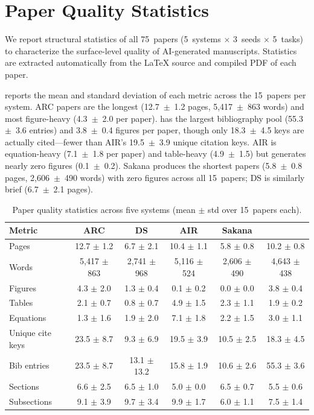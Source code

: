 
\section{Paper Quality Statistics}
\label{app:paper_quality}

We report structural statistics of all 75~papers (5~systems $\times$ 3~seeds $\times$ 5~tasks) to characterize the surface-level quality of AI-generated manuscripts.
Statistics are extracted automatically from the LaTeX source and compiled PDF of each paper.


 reports the mean and standard deviation of each metric across the 15~papers per system.
ARC papers are the longest (12.7~$\pm$~1.2 pages, 5{,}417~$\pm$~863 words) and most figure-heavy (4.3~$\pm$~2.0 per paper).
\sys{} has the largest bibliography pool (55.3~$\pm$~3.6 entries) and 3.8~$\pm$~0.4 figures per paper, though only 18.3~$\pm$~4.5 keys are actually cited---fewer than AIR's 19.5~$\pm$~3.9 unique citation keys.
AIR is equation-heavy (7.1~$\pm$~1.8 per paper) and table-heavy (4.9~$\pm$~1.5) but generates nearly zero figures (0.1~$\pm$~0.2).
Sakana produces the shortest papers (5.8~$\pm$~0.8 pages, 2{,}606~$\pm$~490 words) with zero figures across all 15~papers; DS is similarly brief (6.7~$\pm$~2.1 pages).

\begin{table}[h]
\centering
\small
\caption{Paper quality statistics across five systems (mean $\pm$ std over 15~papers each).}
\label{tab:paper_quality_summary}
\begin{tabular}{@{}lccccc@{}}
\toprule
\textbf{Metric} & \textbf{ARC} & \textbf{DS} & \textbf{AIR} & \textbf{Sakana} & \textbf{\sys{}} \\
\midrule
Pages & 12.7 $\pm$ 1.2 & 6.7 $\pm$ 2.1 & 10.4 $\pm$ 1.1 & 5.8 $\pm$ 0.8 & 10.2 $\pm$ 0.8 \\
Words & 5{,}417 $\pm$ 863 & 2{,}741 $\pm$ 968 & 5{,}116 $\pm$ 524 & 2{,}606 $\pm$ 490 & 4{,}643 $\pm$ 438 \\
Figures & 4.3 $\pm$ 2.0 & 1.3 $\pm$ 0.4 & 0.1 $\pm$ 0.2 & 0.0 $\pm$ 0.0 & 3.8 $\pm$ 0.4 \\
Tables & 2.1 $\pm$ 0.7 & 0.8 $\pm$ 0.7 & 4.9 $\pm$ 1.5 & 2.3 $\pm$ 1.1 & 1.9 $\pm$ 0.2 \\
Equations & 1.3 $\pm$ 1.6 & 1.9 $\pm$ 2.0 & 7.1 $\pm$ 1.8 & 2.2 $\pm$ 1.5 & 3.0 $\pm$ 1.1 \\
Unique cite keys & 23.5 $\pm$ 8.7 & 9.3 $\pm$ 6.9 & 19.5 $\pm$ 3.9 & 10.5 $\pm$ 2.5 & 18.3 $\pm$ 4.5 \\
Bib entries & 23.5 $\pm$ 8.7 & 13.1 $\pm$ 13.2 & 15.8 $\pm$ 1.9 & 10.6 $\pm$ 2.6 & 55.3 $\pm$ 3.6 \\
Sections & 6.6 $\pm$ 2.5 & 6.5 $\pm$ 1.0 & 5.0 $\pm$ 0.0 & 6.5 $\pm$ 0.7 & 5.5 $\pm$ 0.6 \\
Subsections & 9.1 $\pm$ 3.9 & 9.7 $\pm$ 3.4 & 9.9 $\pm$ 1.7 & 6.0 $\pm$ 1.1 & 7.5 $\pm$ 1.4 \\
\bottomrule
\end{tabular}
\end{table}

